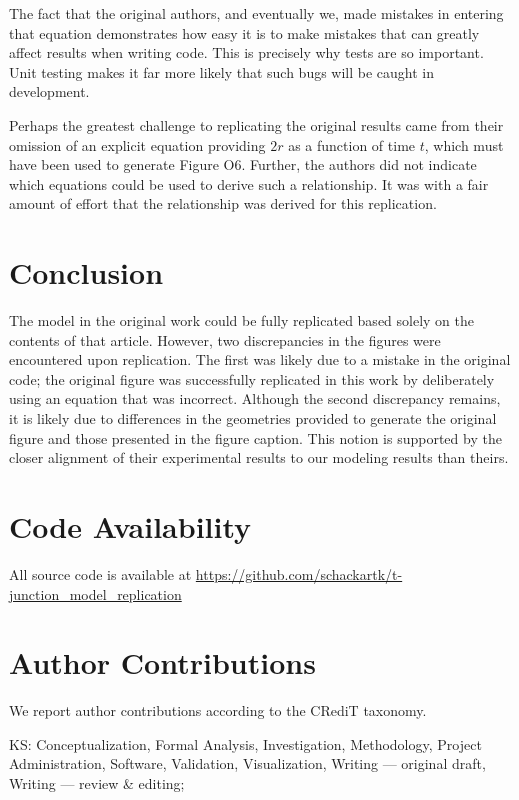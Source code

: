 The fact that the original authors, and eventually we, made mistakes in entering that equation
demonstrates how easy it is to make mistakes that can greatly affect results when writing code.
This is precisely why tests are so important. Unit testing makes it far more likely that
such bugs will be caught in development.

Perhaps the greatest challenge to replicating the original results came from their
omission of an explicit equation providing $2r$ as a function of time $t$, which must have been
used to generate Figure O6. Further, the authors did not indicate which equations could be used to
derive such a relationship. It was with a fair amount of effort that the relationship
was derived for this replication.

\section{Conclusion}

The model in the original work could be fully replicated based solely on the contents of
that article. However, two discrepancies in the figures were encountered upon replication.
The first was likely due to a mistake in the original code; the original figure was successfully
replicated in this work by deliberately using an equation that was incorrect.
Although the second discrepancy remains, it is likely due to differences
in the geometries provided to generate the original figure and those presented in the figure caption.
This notion is supported by the closer alignment of their experimental results to our modeling results
than theirs.

\section{Code Availability}

All source code is available at \url{https://github.com/schackartk/t-junction_model_replication}

\section{Author Contributions}

We report author contributions according to the CRediT taxonomy\supercite{allen_how_2019}.

\noindent KS: Conceptualization, Formal Analysis, Investigation, Methodology,
Project Administration, Software, Validation, Visualization, Writing — original draft,
Writing — review \& editing;

